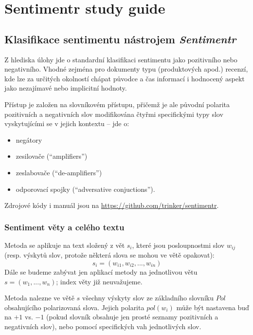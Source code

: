 \chapter{Sentimentr study guide}
\sloppy
\section*{Klasifikace sentimentu nástrojem \emph{Sentimentr}}

Z hlediska úlohy jde o standardní klasifikaci sentimentu jako pozitivního nebo negativního.
Vhodné zejména pro dokumenty typu (produktových apod.) recenzí, kde lze za určitých okolností chápat původce a čas informací i hodnocený aspekt jako nezajímavé nebo implicitní hodnoty.

Přístup je založen na slovníkovém přístupu, přičemž je ale původní polarita pozitivních a negativních slov modifikována čtyřmi specifickými typy slov vyskytujícími se v jejich kontextu -- jde o:
\begin{itemize}
\item negátory
\item zesilovače (``amplifiers'')
\item zeslabovače (``de-amplifiers'')
\item odporovací spojky (``adversative conjuctions'').
\end{itemize}

Zdrojové kódy i manuál jsou na \url{https://github.com/trinker/sentimentr}.

\subsection*{Sentiment věty a celého textu}

Metoda se aplikuje na text složený z vět $s_i$, které jsou posloupnostmi slov $w_{ij}$ (resp. výskytů slov, protože některá slova se mohou ve větě opakovat):
\[
s_i = (w_{i1}, w_{i2}, ..., w_{in})
\]
Dále se budeme zabývat jen aplikací metody na jednotlivou větu $s = (w_1, ..., w_n)$; index věty již neuvažujeme.

Metoda nalezne ve větě $s$ všechny výskyty slov ze základního slovníku $Pol$ obsahujícího polarizovaná slova.
Jejich polarita $pol(w_i)$ může být nastavena buď na $+1$ vs. $-1$ (pokud slovník obsahuje jen prosté seznamy pozitivních a negativních slov), nebo pomocí specifických vah jednotlivých slov.

